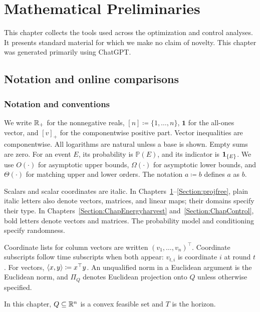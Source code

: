 \chapter{Mathematical Preliminaries}
\label{Section:Preliminaries}

This chapter collects the tools used across the optimization and control
analyses. It presents standard material for which we make no claim of novelty.
This chapter was generated primarily using ChatGPT.

\section{Notation and online comparisons}\label{sec:prelim:notation}
\label{sec:intro:notation}
\label{sec:notation}

\subsection{Notation and conventions}

We write $\mathbb{R}_+$ for the nonnegative reals, $[n]\coloneqq\{1,\ldots,n\}$,
$\mathbf1$ for the all-ones vector, and $[v]_+$ for the componentwise positive
part. Vector inequalities are componentwise. All logarithms are natural unless
a base is shown. Empty sums are zero.
For an event $E$, its probability is $\mathbb P(E)$, and its indicator is $\mathbf{1}_{\{E\}}$.
We use $O(\cdot)$ for asymptotic upper bounds, $\Omega(\cdot)$ for
asymptotic lower bounds, and $\Theta(\cdot)$ for matching upper and lower
orders. The notation $a\coloneqq b$ defines $a$ as $b$.

Scalars and scalar coordinates are italic. In
Chapters~\ref{Section:Preliminaries}--\ref{Section:projfree}, plain italic
letters also denote vectors, matrices, and linear maps; their domains
specify their type. In
Chapters~\ref{Section:ChapEnergyharvest} and~\ref{Section:ChapControl}, bold
letters denote vectors and matrices. The probability model and conditioning
specify randomness.

Coordinate lists for column vectors are written $(v_1,\ldots,v_n)^\top$.
Coordinate subscripts follow time subscripts when both appear:
$v_{t,i}$ is coordinate $i$ at round $t$.
For vectors, $\left\langle x,y \right\rangle\coloneqq x^\top y$.
An unqualified norm in a Euclidean argument is the Euclidean norm, and
$\Pi_Q$ denotes Euclidean projection onto $Q$ unless otherwise specified.

In this chapter, $Q\subseteq\mathbb{R}^n$ is a convex feasible set and $T$ is
the horizon.

